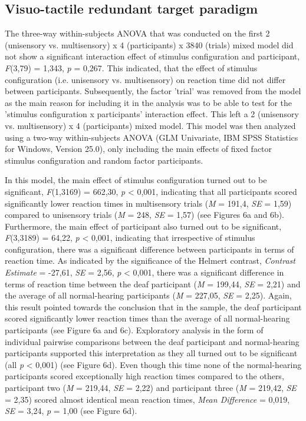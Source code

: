 \documentclass[12pt]{article}
\begin{document}
\subsection{Visuo-tactile redundant target paradigm}
The three-way within-subjects ANOVA that was conducted on the first 2 (unisensory vs. multisensory) x 4 (participants) x 3840 (trials) mixed model did not show a significant interaction effect of stimulus configuration and participant, \textit{F}(3,79) = 1,343, \textit{p} = 0,267. This indicated, that the effect of stimulus configuration (i.e. unisensory vs. multisensory) on reaction time did not differ between participants. Subsequently, the factor 'trial' was removed from the model as the main reason for including it in the analysis was to be able to test for the 'stimulus configuration x participants' interaction effect. This left a 2 (unisensory vs. multisensory) x 4 (participants) mixed model. This model was then analyzed using a two-way within-subjects ANOVA (GLM Univariate, IBM SPSS Statistics for Windows, Version 25.0), only including the main effects of fixed factor stimulus configuration and random factor participants. 
%
\par In this model, the main effect of stimulus configuration turned out to be significant, \textit{F}(1,3169) = 662,30, \textit{p} < 0,001, indicating that all participants scored significantly lower reaction times in multisensory trials (\textit{M} = 191,4, \textit{SE} = 1,59) compared to unisensory trials (\textit{M} = 248, \textit{SE} = 1,57) (see Figures 6a and 6b). Furthermore, the main effect of participant also turned out to be significant, \textit{F}(3,3189) = 64,22, \textit{p} < 0,001, indicating that irrespective of stimulus configuration, there was a significant difference between participants in terms of reaction time. As indicated by the significance of the Helmert contrast, \textit{Contrast Estimate} = -27,61, \textit{SE} = 2,56, \textit{p} < 0,001, there was a significant difference in terms of reaction time between the deaf participant (\textit{M} = 199,44, \textit{SE} = 2,21) and the average of all normal-hearing participants (\textit{M} = 227,05, \textit{SE} = 2,25). Again, this result pointed towards the conclusion that in the sample, the deaf participant scored significantly lower reaction times than the average of all normal-hearing participants (see Figure 6a and 6c). Exploratory analysis in the form of individual pairwise comparisons between the deaf participant and normal-hearing participants supported this interpretation as they all turned out to be significant (all \textit{p} < 0,001) (see Figure 6d). Even though this time none of the normal-hearing participants scored exceptionally high reaction times compared to the others, participant two (\textit{M} = 219,44, \textit{SE} = 2,22) and participant three (\textit{M} = 219,42, \textit{SE} = 2,35) scored almost identical mean reaction times, \textit{Mean Difference} = 0,019, \textit{SE} = 3,24, \textit{p} = 1,00 (see Figure 6d).
\end{document}
